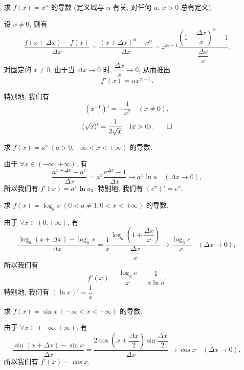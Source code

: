 \begin{example}\label{example:ma-4-1-3}
求 $f(x)=x^\alpha$ 的导数 (定义域与 $\alpha$ 有关, 对任何 $\alpha$, $x>0$ 总有定义).
\end{example}


\begin{solve}
设 $x\ne0$, 则有
\[
  \frac{f(x+\Delta x)-f(x)}{\Delta x}
  =
  \frac{(x+\Delta x)^\alpha-x^\alpha}{\Delta x}
  =
  x^{\alpha-1}
  \frac{\left(1+\dfrac{\Delta x}{x}\right)^\alpha-1}
       {\dfrac{\Delta x}{x}}.
\]
对固定的 $x\ne0$, 由于当 $\Delta x\to0$ 时, $\dfrac{\Delta x}{x}\to0$, 从而推出
\[
  f'(x)=\alpha x^{\alpha-1}.
\]

特别地, 我们有
\[
  (x^{-1})'=-\frac1{x^2}\quad(x\ne0),
\]
\[
  (\sqrt{x})'=\frac1{2\sqrt{x}}\quad(x>0).
\qedhere
\]
\end{solve}


\begin{example}\label{example:ma-4-1-4}
求 $f(x)=a^x\ (a>0,-\infty<x<+\infty)$ 的导数.
\end{example}


\begin{solve}
由于 $\forall x\in(-\infty,+\infty)$, 有
\[
  \frac{a^{x+\Delta x}-a^x}{\Delta x}
  =
  a^x\frac{a^{\Delta x}-1}{\Delta x}
  \to a^x\ln a\quad(\Delta x\to0),
\]
所以我们有 $f'(x)=a^x\ln a$。特别地, 我们有 $(e^x)'=e^x$.
\end{solve}


\begin{example}\label{example:ma-4-1-5}
求 $f(x)=\log_a x\ (0<a\ne1,0<x<+\infty)$ 的导数.
\end{example}


\begin{solve}
由于 $\forall x\in(0,+\infty)$, 有
\[
  \frac{\log_a(x+\Delta x)-\log_a x}{\Delta x}
  =
  \frac1x
  \frac{\log_a\left(1+\dfrac{\Delta x}{x}\right)}
       {\dfrac{\Delta x}{x}}
  \to
  \frac{\log_a e}{x}\quad(\Delta x\to0),
\]
所以我们有
\[
  f'(x)=\frac{\log_a e}{x}=\frac1{x\ln a}.
\]
特别地, 我们有 $(\ln x)'=\dfrac1x$.
\end{solve}


\begin{example}\label{example:ma-4-1-6}
求 $f(x)=\sin x\ (-\infty<x<+\infty)$ 的导数.
\end{example}


\begin{solve}
由于 $\forall x\in(-\infty,+\infty)$, 有
\[
  \frac{\sin(x+\Delta x)-\sin x}{\Delta x}
  =
  \frac{2\cos\left(x+\dfrac{\Delta x}{2}\right)\sin\dfrac{\Delta x}{2}}
       {\Delta x}
  \to
  \cos x\quad(\Delta x\to0),
\]
所以我们有 $f'(x)=\cos x$.
\end{solve}


